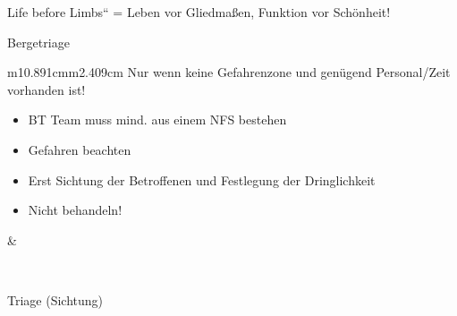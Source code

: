 \documentclass{article}
\begin{document}
{\quotedblbase}Life before Limbs{\textquotedblleft} = Leben vor
Gliedma{\ss}en, Funktion vor Sch\"onheit!

Bergetriage

\begin{center}
\tablehead{}\begin{supertabular}{m{10.891cm}m{2.409cm}}
Nur wenn keine Gefahrenzone und gen\"ugend Personal/Zeit vorhanden ist!

\begin{itemize}
\item BT Team muss mind. aus einem NFS bestehen

\item Gefahren beachten

\item Erst Sichtung der Betroffenen und Festlegung der Dringlichkeit

\item Nicht behandeln!

\end{itemize}
 &
 \par

\\
\end{supertabular}
\end{center}
Triage (Sichtung)
\end{document}
